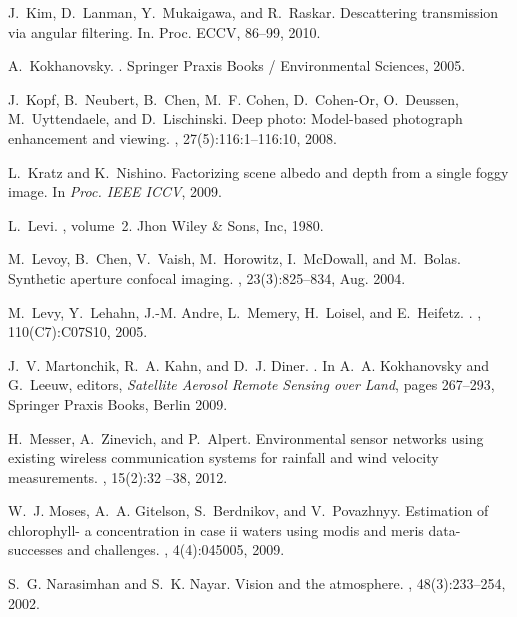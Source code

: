 \documentclass[10pt,twocolumn,letterpaper]{article}
\begin{document}
{\begin{thebibliography}{10}
J.~Kim, D.~Lanman, Y.~Mukaigawa, and R.~Raskar.
\newblock Descattering transmission via angular filtering.
\newblock In. Proc. ECCV, 86--99, 2010.

A.~Kokhanovsky.
.
\newblock Springer Praxis Books / Environmental Sciences, 2005.

J.~Kopf, B.~Neubert, B.~Chen, M.~F. Cohen, D.~Cohen-Or, O.~Deussen,
  M.~Uyttendaele, and D.~Lischinski.
\newblock Deep photo: Model-based photograph enhancement and viewing.
, 27(5):116:1--116:10, 2008.

L.~Kratz and K.~Nishino.
\newblock Factorizing scene albedo and depth from a single foggy image.
\newblock In {\em Proc. IEEE ICCV}, 2009.

L.~Levi.
, volume~2.
\newblock Jhon Wiley \& Sons, Inc, 1980.

M.~Levoy, B.~Chen, V.~Vaish, M.~Horowitz, I.~McDowall, and M.~Bolas.
\newblock Synthetic aperture confocal imaging.
, 23(3):825--834, Aug. 2004.

M.~Levy, Y.~Lehahn, J.-M. Andre, L.~Memery, H.~Loisel, and E.~Heifetz.
.
, 110(C7):C07S10, 2005.

J.~V. Martonchik, R.~A. Kahn, and D.~J. Diner.
.
\newblock In A.~A. Kokhanovsky and G.~Leeuw, editors, {\em Satellite Aerosol
  Remote Sensing over Land}, pages 267--293, Springer Praxis Books,
  Berlin 2009.

H.~Messer, A.~Zinevich, and P.~Alpert.
\newblock Environmental sensor networks using existing wireless communication
  systems for rainfall and wind velocity measurements.
, 15(2):32 --38,
  2012.

W.~J. Moses, A.~A. Gitelson, S.~Berdnikov, and V.~Povazhnyy.
\newblock Estimation of chlorophyll- a concentration in case ii waters using
  modis and meris data-successes and challenges.
, 4(4):045005, 2009.

S.~G. Narasimhan and S.~K. Nayar.
\newblock Vision and the atmosphere.
, 48(3):233--254,  2002.


\end{thebibliography}}
\end{document}
